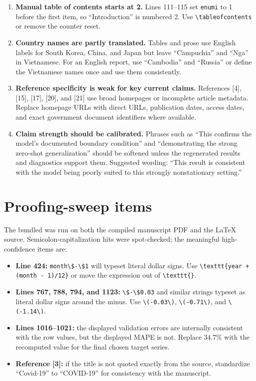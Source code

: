 \documentclass[11pt]{article}
\begin{document}
\begin{enumerate}
\item \textbf{Manual table of contents starts at 2.} Lines 111--115 set \texttt{enumi} to 1 before the first item, so ``Introduction'' is numbered 2. Use \verb|\tableofcontents| or remove the counter reset.
\item \textbf{Country names are partly translated.} Tables and prose use English labels for South Korea, China, and Japan but leave ``Campuchia'' and ``Nga'' in Vietnamese. For an English report, use ``Cambodia'' and ``Russia'' or define the Vietnamese names once and use them consistently.
\item \textbf{Reference specificity is weak for key current claims.} References [4], [15], [17], [20], and [21] use broad homepages or incomplete article metadata. Replace homepage URLs with direct URLs, publication dates, access dates, and exact government document identifiers where available.
\item \textbf{Claim strength should be calibrated.} Phrases such as ``This confirms the model's documented boundary condition'' and ``demonstrating the strong zero-shot generalization'' should be softened unless the regenerated results and diagnostics support them. Suggested wording: ``This result is consistent with the model being poorly suited to this strongly nonstationary setting.''
\end{enumerate}

\section*{Proofing-sweep items}

The bundled  was run on both the compiled manuscript PDF and the LaTeX source. Semicolon-capitalization hits were spot-checked; the meaningful high-confidence items are:

\begin{itemize}
\item \textbf{Line 424:} \verb|month\$-\$1| will typeset literal dollar signs. Use \verb|\texttt{year + (month - 1)/12}| or move the expression out of \verb|\texttt{}|.
\item \textbf{Lines 767, 788, 794, and 1123:} \verb|\$-\$0.03| and similar strings typeset as literal dollar signs around the minus. Use \verb|\(-0.03\)|, \verb|\(-0.71\)|, and \verb|\(-1.14\)|.
\item \textbf{Lines 1016--1021:} the displayed validation errors are internally consistent with the row values, but the displayed MAPE is not. Replace \(34.7\%\) with the recomputed value for the final chosen target series.
\item \textbf{Reference [3]:} if the title is not quoted exactly from the source, standardize ``Covid-19'' to ``COVID-19'' for consistency with the manuscript.
\end{itemize}
\end{document}
